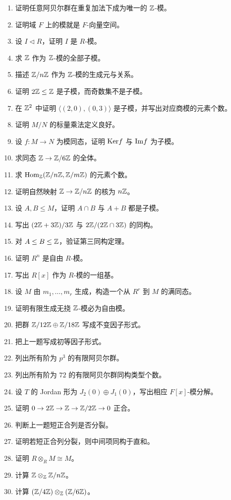 \begin{enumerate}[label=\textbf{\arabic*.}, leftmargin=*, itemsep=0.5em]
\item \basic 证明任意阿贝尔群在重复加法下成为唯一的 $\mathbb{Z}$-模。
\item \basic 证明域 $F$ 上的模就是 $F$-向量空间。
\item \basic 设 $I\triangleleft R$，证明 $I$ 是 $R$-模。
\item \basic 求 $\mathbb{Z}$ 作为 $\mathbb{Z}$-模的全部子模。
\item \basic 描述 $\mathbb{Z}/n\mathbb{Z}$ 作为 $\mathbb{Z}$-模的生成元与关系。
\item \basic 证明 $2\mathbb{Z}\le \mathbb{Z}$ 是子模，而奇数集不是子模。
\item \basic 在 $\mathbb{Z}^2$ 中证明 $\langle (2,0),(0,3)\rangle$ 是子模，并写出对应商模的元素个数。
\item \basic 证明 $M/N$ 的标量乘法定义良好。
\item \basic 设 $f:M\to N$ 为模同态，证明 $\mathrm{Ker} f$ 与 $\mathrm{Im} f$ 为子模。
\item \basic 求同态 $\mathbb{Z}\to \mathbb{Z}/6\mathbb{Z}$ 的全体。
\item \basic 求 $\mathrm{Hom}_{\mathbb{Z}}(\mathbb{Z}/n\mathbb{Z},\mathbb{Z}/m\mathbb{Z})$ 的元素个数。
\item \basic 证明自然映射 $\mathbb{Z}\to \mathbb{Z}/n\mathbb{Z}$ 的核为 $n\mathbb{Z}$。
\item \basic 设 $A,B\le M$，证明 $A\cap B$ 与 $A+B$ 都是子模。
\item \basic 写出 $(2\mathbb{Z}+3\mathbb{Z})/3\mathbb{Z}$ 与 $2\mathbb{Z}/(2\mathbb{Z}\cap 3\mathbb{Z})$ 的同构。
\item \basic 对 $A\le B\le \mathbb{Z}$，验证第三同构定理。
\item \basic 证明 $R^n$ 是自由 $R$-模。
\item \basic 写出 $R[x]$ 作为 $R$-模的一组基。
\item \basic 设 $M$ 由 $m_1,\dots,m_r$ 生成，构造一个从 $R^r$ 到 $M$ 的满同态。
\item \basic 证明有限生成无挠 $\mathbb{Z}$-模必为自由模。
\item \basic 把群 $\mathbb{Z}/12\mathbb{Z}\oplus \mathbb{Z}/18\mathbb{Z}$ 写成不变因子形式。
\item \basic 把上一题写成初等因子形式。
\item \basic 列出所有阶为 $p^3$ 的有限阿贝尔群。
\item \basic 列出所有阶为 $72$ 的有限阿贝尔群同构类型个数。
\item \basic 设 $T$ 的 Jordan 形为 $J_2(0)\oplus J_1(0)$，写出相应 $F[x]$-模分解。
\item \basic 证明 $0\to 2\mathbb{Z}\to \mathbb{Z}\to \mathbb{Z}/2\mathbb{Z}\to 0$ 正合。
\item \basic 判断上一题短正合列是否分裂。
\item \basic 证明若短正合列分裂，则中间项同构于直和。
\item \basic 证明 $R\otimes_R M\cong M$。
\item \basic 计算 $\mathbb{Z}\otimes_{\mathbb{Z}} \mathbb{Z}/n\mathbb{Z}$。
\item \basic 计算 $(\mathbb{Z}/4\mathbb{Z})\otimes_{\mathbb{Z}} (\mathbb{Z}/6\mathbb{Z})$。
\end{enumerate}

